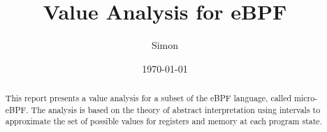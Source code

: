 \documentclass{article}
\title{Value Analysis for eBPF}
\author{Simon}
\date{\today}
\begin{document}
\maketitle

\begin{abstract}
This report presents a value analysis for a subset of the eBPF language, called
micro-eBPF. The analysis is based on the theory of abstract interpretation
using intervals to approximate the set of possible values for registers and
  memory at each program state.
\end{abstract}

\tableofcontents








\end{document}
